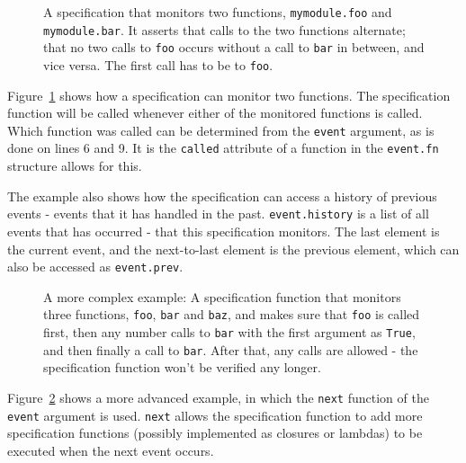 \documentclass[a4paper,11pt]{kth-mag}
\begin{document}
\begin{figure}[h!]
	\begin{center}
	\begin{minipage}{0.7\textwidth}
	
	\end{minipage}
	\end{center}

	\caption{A specification that monitors two functions, \texttt{mymodule.foo}
	and \texttt{mymodule.bar}. It asserts that calls to the two functions
alternate; that no two calls to \texttt{foo} occurs without a call to
\texttt{bar} in between, and vice versa. The first call has to be to
\texttt{foo}.}
	\label{figure-syntax-example-2}
\end{figure}

Figure~\ref{figure-syntax-example-2} shows how a specification can monitor two
functions. The specification function will be called whenever either of the
monitored functions is called. Which function was called can be determined from
the \texttt{event} argument, as is done on lines 6 and 9. It is the
\texttt{called} attribute of a function in the \texttt{event.fn} structure
allows for this.

The example also shows how the specification can access a history of previous
events - events that it has handled in the past. \texttt{event.history} is a
list of all events that has occurred - that this specification monitors. The
last element is the current event, and the next-to-last element is the previous
element, which can also be accessed as \texttt{event.prev}.

\begin{figure}[h!]
	\begin{center}
	\begin{minipage}{0.7\textwidth}
	
	\end{minipage}
	\end{center}

	\caption{A more complex example: A specification function that monitors three
		functions, \texttt{foo}, \texttt{bar} and \texttt{baz}, and makes sure that
		\texttt{foo} is called first, then any number calls to \texttt{bar} with
		the first argument as \texttt{True}, and then finally a call to
	\texttt{bar}. After that, any calls are allowed - the specification function
won't be verified any longer.}
	\label{figure-syntax-example-3}
\end{figure}

Figure~\ref{figure-syntax-example-3} shows a more advanced example, in which
the \texttt{next} function of the \texttt{event} argument is used.
\texttt{next} allows the specification function to add more specification
functions (possibly implemented as closures or lambdas) to be executed when the
next event occurs.
\end{document}
